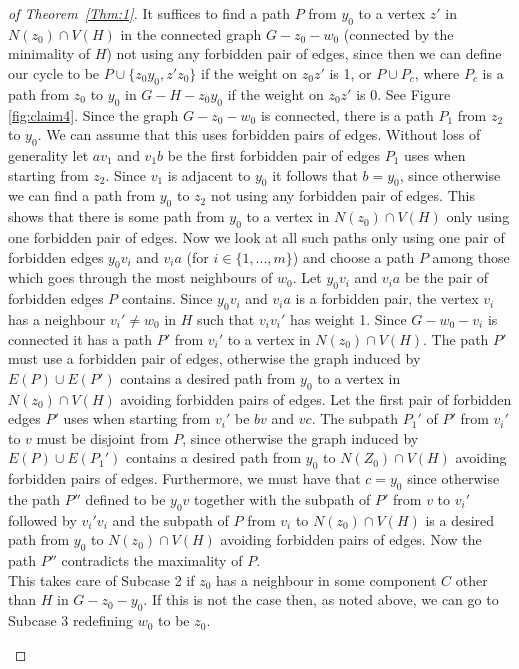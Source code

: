 \documentclass[
final,
 nomarks,
]{dmtcs-episciences}
\theoremstyle{definition}
\begin{document}
\begin{proof}[of Theorem~\ref{Thm:1}]
It suffices to find a path $P$ from $y_0$ to a vertex $z'$ in $N(z_0) \cap V(H)$ in the connected graph $G-z_0-w_0$ (connected by the minimality of $H$) not using any forbidden pair of edges, since then we can define our cycle to be $P \cup \{z_0y_0,z'z_0\}$ if the weight on $z_0z'$ is 1, or $P \cup P_c$, where $P_c$ is a path from $z_0$ to $y_0$ in $G-H-z_0y_0$ if the weight on $z_0z'$ is 0. See Figure \ref{fig:claim4}. Since the graph $G-z_0-w_0$ is connected, there is a path $P_1$ from $z_2$ to $y_0$. We can assume that this uses forbidden pairs of edges. Without loss of generality let $av_1$ and $v_1b$ be the first forbidden pair of edges $P_1$ uses when starting from $z_2$. Since $v_1$ is adjacent to $y_0$ it follows that $b=y_0$, since otherwise we can find a path from $y_0$ to $z_2$ not using any forbidden pair of edges. This shows that there is some path from $y_0$ to a vertex in $N(z_0) \cap V(H)$ only using one forbidden pair of edges. Now we look at all such paths only using one pair of forbidden edges $y_0v_i$ and $v_ia$ (for $i \in \{1,...,m\}$) and choose a path $P$ among those which goes through the most neighbours of $w_0$. Let $y_0v_i$ and $v_ia$ be the pair of forbidden edges $P$ contains. Since $y_0v_i$ and $v_ia$ is a forbidden pair, the vertex $v_i$ has a neighbour $v_i' \neq w_0$ in $H$ such that $v_iv_i'$ has weight 1. Since $G-w_0-v_i$ is connected it has a path $P'$ from $v_i'$ to a vertex in $N(z_0) \cap V(H)$. The path $P'$ must use a forbidden pair of edges, otherwise the graph induced by $E(P) \cup E(P')$ contains a desired path from $y_0$ to a vertex in $N(z_0) \cap V(H)$ avoiding forbidden pairs of edges. Let the first pair of forbidden edges $P'$ uses when starting from $v_i'$ be $bv$ and $vc$. The subpath $P_1'$ of $P'$ from $v_i'$ to $v$ must be disjoint from $P$, since otherwise the graph induced by $E(P) \cup E(P_1')$ contains a desired path from $y_0$ to $N(Z_0) \cap V(H)$ avoiding forbidden pairs of edges. Furthermore, we must have that $c=y_0$ since otherwise the path $P''$ defined to be $y_0v$ together with the subpath of $P'$ from $v$ to $v_i'$ followed by $v_i'v_i$ and the subpath of $P$ from $v_i$ to $N(z_0) \cap V(H)$ is a desired path from $y_0$ to $N(z_0) \cap V(H)$ avoiding forbidden pairs of edges. Now the path $P''$ contradicts the maximality of $P$. \\ 
This takes care of Subcase 2 if $z_0$ has a neighbour in some component $C$ other than $H$ in $G-z_0-y_0$. If this is not the case then, as noted above, we can go to Subcase 3 redefining $w_0$ to be $z_0$.
\begin{figure}[H]

\end{figure}
\end{proof}
\end{document}
